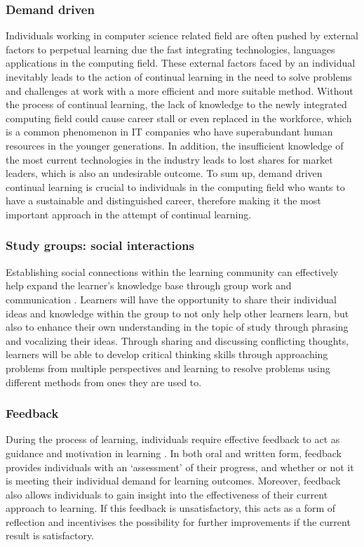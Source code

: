 \documentclass[a4paper, 11pt]{report}
\begin{document}
\subsubsection{Demand driven}

Individuals working in computer science related field are often pushed by external factors to perpetual learning due the fast integrating technologies, languages applications in the computing field. These external factors faced by an individual inevitably leads to the action of continual learning in the need to solve problems and challenges at work with a more efficient and more suitable method. Without the process of continual learning, the lack of knowledge to the newly integrated computing field could cause career stall or even replaced in the workforce, which is a common phenomenon in IT companies who have superabundant human resources in the younger generations. In addition, the insufficient knowledge of the most current technologies in the industry leads to lost shares for market leaders, which is also an undesirable outcome. To sum up, demand driven continual learning is crucial to individuals in the computing field who wants to have a sustainable and distinguished career, therefore making it the most important approach in the attempt of continual learning. 

\subsubsection{Study groups: social interactions}
Establishing social connections within the learning community can effectively help expand the learner’s knowledge base through group work and communication \cite{laal2012benefits}. Learners will have the opportunity to share their individual ideas and knowledge within the group to not only help other learners learn, but also to enhance their own understanding in the topic of study through phrasing and vocalizing their ideas. Through sharing and discussing conflicting thoughts, learners will be able to develop critical thinking  skills through approaching problems from multiple perspectives and learning to resolve problems using different methods from ones they are used to. 


\subsubsection{Feedback}
During the process of learning, individuals require effective feedback to act as guidance and motivation in learning \cite{vollmeyer2005surprising}. In both oral and written form, feedback provides individuals with an ‘assessment’ of their progress, and whether or not it is meeting their individual demand for learning outcomes. Moreover, feedback also allows individuals to gain insight into the effectiveness of their current approach to learning. If this feedback is unsatisfactory, this acts as a form of reflection and incentivises the possibility for further improvements if the current result is satisfactory. 
\end{document}
